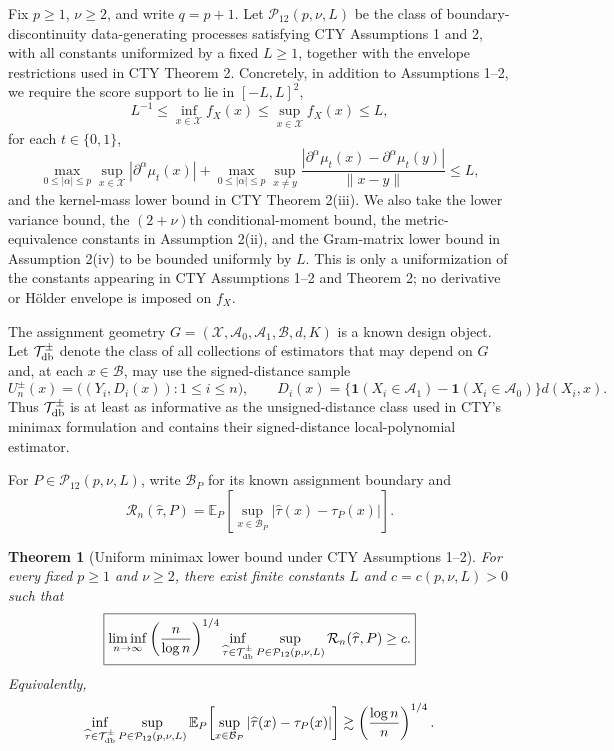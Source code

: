 \documentclass[11pt]{article}
\newtheorem{theorem}{Theorem}
\newcommand{\E}{\mathbb E}
\newcommand{\1}{\mathbf 1}
\begin{document}
Fix $p\ge1$, $\nu\ge2$, and write $q=p+1$.  Let $\mathcal P_{12}(p,\nu,L)$ be the class of boundary-discontinuity data-generating processes satisfying CTY Assumptions 1 and 2, with all constants uniformized by a fixed $L\ge1$, together with the envelope restrictions used in CTY Theorem 2.  Concretely, in addition to Assumptions 1--2, we require the score support to lie in $[-L,L]^2$,
\[
L^{-1}\le \inf_{x\in\mathcal X}f_X(x)
\le \sup_{x\in\mathcal X}f_X(x)\le L,
\]
for each $t\in\{0,1\}$,
\[
\max_{0\le|\alpha|\le p}\sup_{x\in\mathcal X}|\partial^\alpha\mu_t(x)|
+
\max_{0\le|\alpha|\le p}\sup_{x\ne y}
\frac{|\partial^\alpha\mu_t(x)-\partial^\alpha\mu_t(y)|}{\|x-y\|}
\le L,
\]
and the kernel-mass lower bound in CTY Theorem 2(iii).  We also take the lower variance bound, the $(2+\nu)$th conditional-moment bound, the metric-equivalence constants in Assumption 2(ii), and the Gram-matrix lower bound in Assumption 2(iv) to be bounded uniformly by $L$.  This is only a uniformization of the constants appearing in CTY Assumptions 1--2 and Theorem 2; no derivative or H\"older envelope is imposed on $f_X$.

The assignment geometry $G=(\mathcal X,\mathcal A_0,\mathcal A_1,\mathcal B,d,K)$ is a known design object.  Let $\mathcal T_{\rm db}^{\pm}$ denote the class of all collections of estimators that may depend on $G$ and, at each $x\in\mathcal B$, may use the signed-distance sample
\[
U_n^{\pm}(x)=\bigl((Y_i,D_i(x)):1\le i\le n\bigr),
\qquad
D_i(x)=\{\1(X_i\in\mathcal A_1)-\1(X_i\in\mathcal A_0)\}d(X_i,x).
\]
Thus $\mathcal T_{\rm db}^{\pm}$ is at least as informative as the unsigned-distance class used in CTY's minimax formulation and contains their signed-distance local-polynomial estimator.

For $P\in\mathcal P_{12}(p,\nu,L)$, write $\mathcal B_P$ for its known assignment boundary and
\[
\mathcal R_n(\widehat\tau,P)
=
\E_P\!\left[
\sup_{x\in\mathcal B_P}|\widehat\tau(x)-\tau_P(x)|
\right].
\]

\begin{theorem}[Uniform minimax lower bound under CTY Assumptions 1--2]
\label{thm:main}
For every fixed $p\ge1$ and $\nu\ge2$, there exist finite constants $L$ and $c=c(p,\nu,L)>0$ such that
\[
\boxed{
\liminf_{n\to\infty}
\left(\frac{n}{\log n}\right)^{1/4}
\inf_{\widehat\tau\in\mathcal T_{\rm db}^{\pm}}
\sup_{P\in\mathcal P_{12}(p,\nu,L)}
\mathcal R_n(\widehat\tau,P)
\ge c.
}
\]
Equivalently,
\[
\inf_{\widehat\tau\in\mathcal T_{\rm db}^{\pm}}
\sup_{P\in\mathcal P_{12}(p,\nu,L)}
\E_P\!\left[
\sup_{x\in\mathcal B_P}|\widehat\tau(x)-\tau_P(x)|
\right]
\gtrsim
\left(\frac{\log n}{n}\right)^{1/4}.
\]
\end{theorem}
\end{document}
